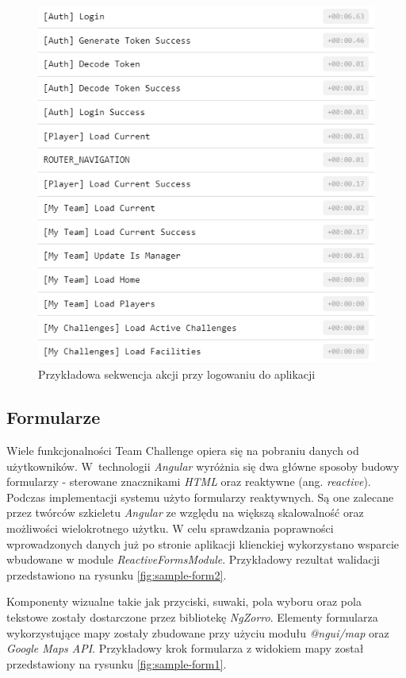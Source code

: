 \begin{figure}[H]
\centering
\includegraphics[width=0.45\linewidth]{06-implementacja/rys/actions.PNG}
\caption{Przykładowa sekwencja akcji przy logowaniu do aplikacji}
\label{fig:actions}
\end{figure}


\subsection{Formularze}

Wiele funkcjonalności Team Challenge opiera się na pobraniu danych od użytkowników. W~technologii \textit{Angular} wyróżnia się dwa główne sposoby budowy formularzy - sterowane znacznikami \textit{HTML} oraz reaktywne (ang. \textit{reactive}). Podczas implementacji systemu użyto formularzy reaktywnych. Są one zalecane przez twórców szkieletu \textit{Angular} ze względu na większą skalowalność oraz możliwości wielokrotnego użytku. W celu sprawdzania poprawności wprowadzonych danych już po stronie aplikacji klienckiej wykorzystano wsparcie wbudowane w module \textit{ReactiveFormsModule}. Przykładowy rezultat walidacji przedstawiono na rysunku \ref{fig:sample-form2}.

Komponenty wizualne takie jak przyciski, suwaki, pola wyboru oraz pola tekstowe zostały dostarczone przez bibliotekę \textit{NgZorro}.  Elementy formularza wykorzystujące mapy zostały zbudowane przy użyciu modułu \textit{@ngui/map} oraz \textit{Google Maps API}. Przykładowy krok formularza z widokiem mapy został przedstawiony na rysunku \ref{fig:sample-form1}.

